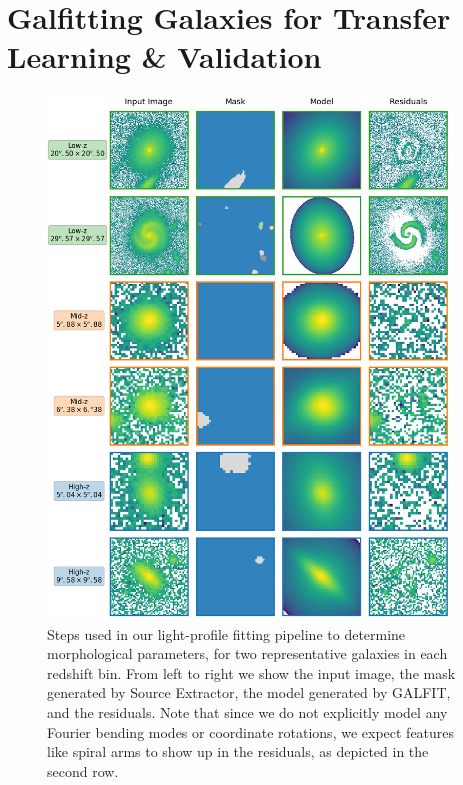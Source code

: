 \section{Galfitting Galaxies for Transfer Learning \& Validation} \label{sec_c3:galfitting}

\begin{figure}
    \centering
    \includegraphics[width = 0.95\textwidth]{galfit_example_fits.png}
    \caption{
     Steps used in our light-profile fitting pipeline to determine morphological parameters, for two representative galaxies in each redshift bin. From left to right we show the input image, the  mask generated by Source Extractor, the model generated by GALFIT, and the residuals. Note that since we do not explicitly model any Fourier bending modes or coordinate rotations, we expect features like spiral arms to show up in the residuals, as depicted in the second row.
    }
    \label{fig_c3:galfit_example_fits}
\end{figure}

